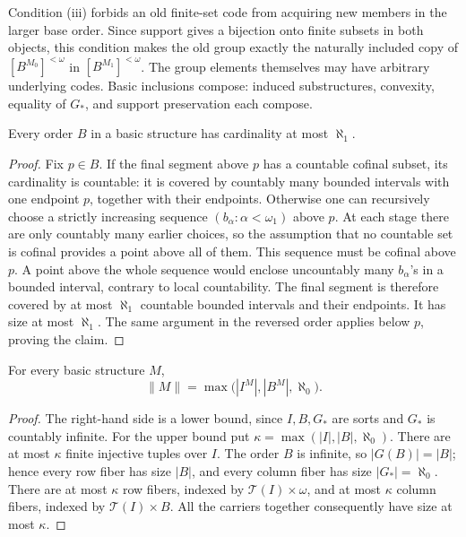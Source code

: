 Condition (iii) forbids an old finite-set code from acquiring new
members in the larger base order.  Since support gives a bijection
onto finite subsets in both objects, this condition makes the old
group exactly the naturally included copy of
\([B^{M_0}]^{<\omega}\) in \([B^{M_1}]^{<\omega}\).  The group
elements themselves may have arbitrary underlying codes.
Basic inclusions compose: induced substructures, convexity,
equality of \(G_*\), and support preservation each compose.

\begin{lemma}\label{aec:order-size}
Every order \(B\) in a basic structure has cardinality at most
\(\aleph_1\).
\end{lemma}

\begin{proof}
Fix \(p\in B\).  If the final segment above \(p\) has a countable
cofinal subset, its cardinality is countable: it is covered by
countably many bounded intervals with one endpoint \(p\), together
with their endpoints.  Otherwise one can recursively choose a
strictly increasing sequence
\((b_\alpha:\alpha<\omega_1)\) above \(p\).  At each stage there
are only countably many earlier choices, so the assumption that
no countable set is cofinal provides a point above all of them.
This sequence must be cofinal above \(p\).  A point above the
whole sequence would enclose uncountably many \(b_\alpha\)'s
in a bounded interval, contrary to local countability.
The final segment is therefore covered by at most \(\aleph_1\)
countable bounded intervals and their endpoints.  It has size at
most \(\aleph_1\).  The same argument in the reversed order
applies below \(p\), proving the claim.
\end{proof}

\begin{lemma}\label{aec:size}
For every basic structure \(M\),
\begin{equation}\label{aec:size-equation}
 \|M\|=\max\bigl(|I^M|,|B^M|,\aleph_0\bigr).
\end{equation}
\end{lemma}

\begin{proof}
The right-hand side is a lower bound, since \(I,B,G_*\) are
sorts and \(G_*\) is countably infinite.  For the upper bound put
\(\kappa=\max(|I|,|B|,\aleph_0)\).
There are at most \(\kappa\) finite injective tuples over \(I\).
The order \(B\) is infinite, so \(|G(B)|=|B|\); hence every
row fiber has size \(|B|\), and every column fiber has size
\(|G_*|=\aleph_0\).
There are at most \(\kappa\) row fibers, indexed by
\(\mathcal T(I)\times\omega\), and at most \(\kappa\) column
fibers, indexed by \(\mathcal T(I)\times B\).
All the carriers together consequently have size at most
\(\kappa\).
\end{proof}

